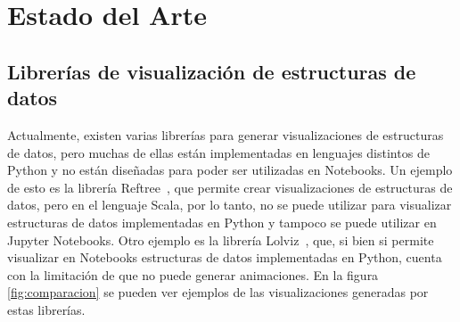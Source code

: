 \chapter{Estado del Arte}

\section{Librerías de visualización de estructuras de datos}

Actualmente, existen varias librerías para generar visualizaciones de estructuras de datos, pero muchas de ellas están implementadas en lenguajes distintos de Python y no están diseñadas para poder ser utilizadas en Notebooks.
Un ejemplo de esto es la librería Reftree~\cite{Stanch2021}, que permite crear visualizaciones de estructuras de datos, pero en el lenguaje Scala, por lo tanto, no se puede utilizar para visualizar estructuras de datos implementadas en Python y tampoco se puede utilizar en Jupyter Notebooks.
Otro ejemplo es la librería Lolviz~\cite{Lolviz}, que, si bien si permite visualizar en Notebooks estructuras de datos implementadas en Python, cuenta con la limitación de que no puede generar animaciones. En la figura \ref{fig:comparacion} se pueden ver ejemplos de las visualizaciones generadas por estas librerías.

